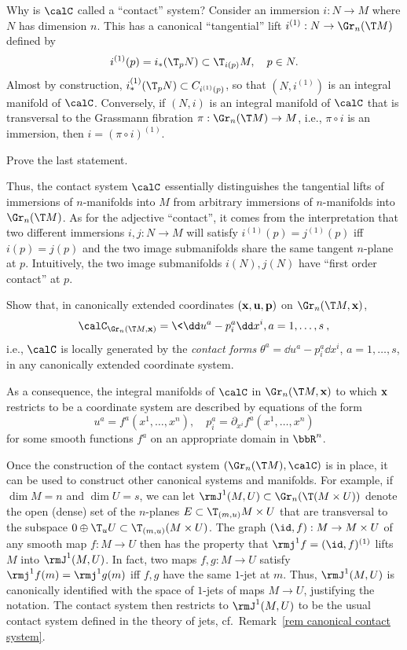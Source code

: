 Why is $\calC$ called a ``contact'' system? Consider an immersion $i:N\to M$ where $N$ has dimension $n$. This has a canonical ``tangential'' lift $i^{(1)}:N\to \Gr_n(\T M)$ defined by 
\[i^{(1)}(p)=i_\ast(\T_p N)\subset \T_{i(p)}M,\quad p\in N.\]
Almost by construction, $i_\ast^{(1)}(\T_p N)\subset C_{i^{(1)}(p)}$, so that $(N,i^{(1)})$ is an integral manifold of $\calC$. Conversely, if $(N,i)$ is an integral manifold of $\calC$ that is transversal to the Grassmann fibration $\pi:\Gr_n(\T M)\to M$, i.e., $\pi\circ i$ is an immersion, then $i=(\pi\circ i)^{(1)}$.

\begin{xca}
    Prove the last statement.
\end{xca}

Thus, the contact system $\calC$ essentially distinguishes the tangential lifts of immersions of $n$-manifolds into $M$ from arbitrary immersions of $n$-manifolds into $\Gr_n(\T M)$. As for the adjective ``contact'', it comes from the interpretation that two different immersions $i,j:N\to M$ will satisfy $i^{(1)}(p)=j^{(1)}(p)$ iff $i(p)=j(p)$ and the two image submanifolds share the same tangent $n$-plane at $p$. Intuitively, the two image submanifolds $i(N), j(N)$ have ``first order contact'' at $p$.

\begin{xca}
    Show that, in canonically extended coordinates $(\bf{x},\bf{u},\bf{p})$ on $\Gr_n(\T M,\bf{x})$, 
    \[\calC_{\Gr_n(\T M,\bf{x})}=\<\dd u^a-p^a_i\dd x^i,a=1,\ldots,s\>,\]
    i.e., $\calC$ is locally generated by the \emph{contact forms} $\theta^a=\dd u^a-p^a_i\dd x^i$, $a=1,\ldots,s$, in any canonically extended coordinate system.
\end{xca}

As a consequence, the integral manifolds of $\calC$ in $\Gr_n(\T M,\bf{x})$ to which $\bf{x}$ restricts to be a coordinate system are described by equations of the form 
\[u^a=f^a(x^1,\ldots,x^n),\quad p^a_i=\partial_{x^i}f^a(x^1,\ldots,x^n)\]
for some smooth functions $f^a$ on an appropriate domain in $\bbR^n$.

Once the construction of the contact system $(\Gr_n(\T M),\calC)$ is in place, it can be used to construct other canonical systems and manifolds. For example, if $\dim M=n$ and $\dim U=s$, we can let $\rmJ^1(M,U)\subset\Gr_n(\T (M\times U))$ denote the open (dense) set of the $n$-planes $E\subset\T_{(m,u)}M\times U$ that are transversal to the subspace $0\oplus \T_u U\subset\T_{(m,u)}(M\times U)$. The graph $(\id,f):M\to M\times U$ of any smooth map $f:M\to U$ then has the property that $\rmj^1 f=(\id,f)^{(1)}$ lifts $M$ into $\rmJ^1(M,U)$. In fact, two maps $f,g:M\to U$ satisfy $\rmj^1 f(m)=\rmj^1 g(m)$ iff $f,g$ have the same $1$-jet at $m$. Thus, $\rmJ^1(M,U)$ is canonically identified with the space of $1$-jets of maps $M\to U$, justifying the notation. The contact system then restricts to $\rmJ^1(M,U)$ to be the usual contact system defined in the theory of jets, cf.\ Remark~\ref{rem canonical contact system}.

